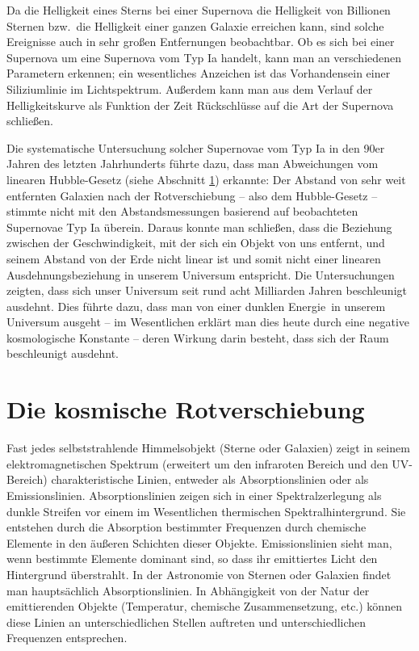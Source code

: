 Da die Helligkeit eines Sterns bei einer Supernova die Helligkeit von Billionen Sternen bzw.\
die Helligkeit einer ganzen Galaxie erreichen kann, sind solche Ereignisse auch 
in sehr gro\ss en Entfernungen beobachtbar. Ob es sich bei
einer Supernova um eine Supernova vom Typ Ia handelt, kann man an verschiedenen
Parametern erkennen; ein wesentliches Anzeichen ist das Vorhandensein einer Siliziumlinie
im Lichtspektrum. Au\ss erdem kann man aus dem Verlauf der Helligkeitskurve als Funktion
der Zeit R\"uckschl\"usse auf die Art der Supernova schlie\ss en.  

Die systematische Untersuchung solcher Supernovae vom Typ Ia in den 90er Jahren des letzten
Jahrhunderts f\"uhrte dazu, dass man Abweichungen vom linearen Hubble-Gesetz (siehe 
Abschnitt \ref{sec_Hubble}) erkannte: Der Abstand von sehr weit entfernten Galaxien nach
der Rotverschiebung -- also dem Hubble-Gesetz -- stimmte nicht mit den Abstandsmessungen
basierend auf beobachteten Supernovae Typ Ia \"uberein. Daraus konnte man schlie\ss en, dass
die Beziehung zwischen der Geschwindigkeit, mit der sich ein Objekt von uns entfernt, und
seinem Abstand von der Erde nicht linear ist und somit nicht einer linearen Ausdehnungsbeziehung
in unserem Universum entspricht. Die Untersuchungen zeigten, dass sich unser Universum seit rund
acht Milliarden Jahren beschleunigt ausdehnt. Dies f\"uhrte dazu, dass man von einer
\glqq dunklen Energie\grqq\ in unserem\index{Dunkle Energie} 
Universum ausgeht -- im Wesentlichen erkl\"art man
dies heute durch eine negative kosmologische Konstante -- deren Wirkung darin besteht, 
dass sich der Raum beschleunigt ausdehnt.  

\section{Die kosmische Rotverschiebung}
\label{sec_Hubble}

Fast jedes selbststrahlende Himmelsobjekt (Sterne oder Galaxien) zeigt in seinem elektromagnetischen
Spektrum (erweitert um den infraroten Bereich und den UV-Bereich) charakteristische Linien,
entweder als Absorptionslinien oder als Emissionslinien. Absorptionslinien zeigen sich in einer
Spektralzerlegung als dunkle Streifen vor einem im Wesentlichen thermischen Spektralhintergrund.
Sie entstehen durch die Absorption bestimmter Frequenzen durch chemische Elemente in den \"au\ss eren 
Schichten dieser Objekte. Emissionslinien sieht man, wenn bestimmte Elemente dominant
sind, so dass ihr emittiertes Licht den Hintergrund \"uberstrahlt. In der Astronomie von Sternen oder
Galaxien findet man haupts\"achlich Absorptionslinien. In Abh\"angigkeit von der Natur der
emittierenden Objekte (Temperatur, chemische Zusammensetzung, etc.) k\"onnen diese Linien
an unterschiedlichen Stellen auftreten und unterschiedlichen Frequenzen entsprechen.

